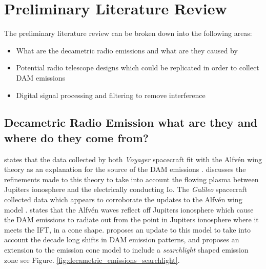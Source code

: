 \documentclass[runningheads,a4paper]{llncs}
\begin{document}
%
%
\newpage
\section*{Preliminary Literature Review}

The preliminary literature review can be broken down into the following areas:


\begin{itemize}
  \item[\textbullet] What are the decametric radio emissions and what are they caused by
  \item[\textbullet] Potential radio telescope designs which could be replicated in order to collect DAM emissions
  \item[\textbullet] Digital signal processing and filtering to remove interference
\end{itemize}

\subsection*{Decametric Radio Emission what are they and where do they come from?}

\cite{belcher87} states that the data collected by both \textit{Voyager} spacecraft fit with the Alfv\'en wing theory as an explanation for the source of the \gls{DAM} emissions \citep{belcher87}. \cite{kivelson96} discusses the refinements made to this theory to take into account the flowing plasma between Jupiters ionosphere and the electrically conducting Io. The \textit{Galileo} spacecraft collected data which appears to corroborate the updates to the Alfv\'en wing model \citep{kivelson96}. \cite{bose08} states that the Alfv\'en waves reflect off Jupiters ionosphere which cause the \gls{DAM} emissions to radiate out from the point in Jupiters ionosphere where it meets the \gls{IFT}, in a cone shape. \cite{imai-08} proposes an update to this model to take into account the decade long shifts in \gls{DAM} emission patterns, and proposes an extension to the emission cone model to include a \textit{searchlight} shaped emission zone \citep{imai-08} see Figure. \ref{fig:decametric_emissions_searchlight}.
\end{document}
